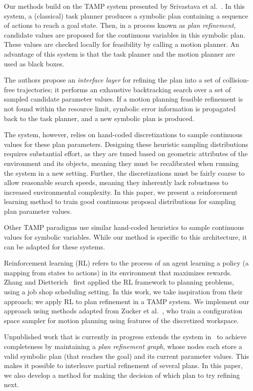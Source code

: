 Our methods build on the TAMP system presented by Srivastava et al.~\cite{srivastava2014combined}.
In this system, a (classical) task planner produces a symbolic plan containing
a sequence of actions to reach a goal state. Then, in a process known as \emph{plan refinement},
candidate values are proposed for the continuous variables in this symbolic plan.
These values are checked locally for feasibility by calling a motion planner.
An advantage of this system is that the task planner and the motion planner are used as black boxes.

The authors propose an \emph{interface layer} for refining the plan into a set
of collision-free trajectories; it performs an exhaustive backtracking search over a
set of sampled candidate parameter values. If a motion planning feasible
refinement is not found within the resource limit, symbolic error information is
propagated back to the task planner, and a new symbolic plan is produced.

The system, however, relies on hand-coded discretizations to sample continuous values for these
plan parameters. Designing these heuristic sampling distributions requires substantial effort,
as they are tuned based on geometric attributes of the environment and its objects, meaning they
must be recalibrated when running the system in a new setting. Further,
the discretizations must be fairly coarse to allow reasonable search speeds, meaning they inherently lack
robustness to increased environmental complexity. In this paper, we present a reinforcement
learning method to train good continuous proposal distributions for sampling plan parameter values.

Other TAMP paradigms use similar hand-coded heuristics to sample continuous values for symbolic variables.
While our method is specific to this architecture, it can be adapted for these systems.

Reinforcement learning (RL) refers to the process of an agent learning a policy (a mapping from states to actions)
in its environment that maximizes rewards. Zhang and Dietterich~\cite{JobShopSched} first applied the RL framework
to planning problems, using a job shop scheduling setting. In this work, we take inspiration from
their approach; we apply RL to plan refinement in a TAMP system. We implement our approach using methods adapted from
Zucker et al.~\cite{workspacebias}, who train a configuration space sampler for motion planning
using features of the discretized workspace.

Unpublished work that is currently in progress extends the system in~\cite{srivastava2014combined} to achieve completeness by
maintaining a \emph{plan refinement graph}, whose nodes each store a valid
symbolic plan (that reaches the goal) and its current parameter values. This makes it possible to interleave
partial refinement of several plans. In this paper, we also develop a method for making the decision of
which plan to try refining next.

